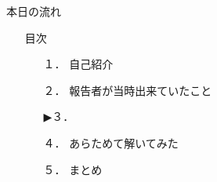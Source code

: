 \begin{frame}{本日の流れ}
  \begin{itemize}
      \item[] 目次
      \begin{itemize}[itemsep=1.3ex, leftmargin=1cm]
        \item[１．] {\color{cud_lightgray} 自己紹介}
        \item[２．] {\color{cud_lightgray} 報告者が当時出来ていたこと}
        \item[▶３．] 
        \item[４．] あらためて解いてみた
        \item[５．] まとめ
     \end{itemize}
  \end{itemize}
\end{frame}
